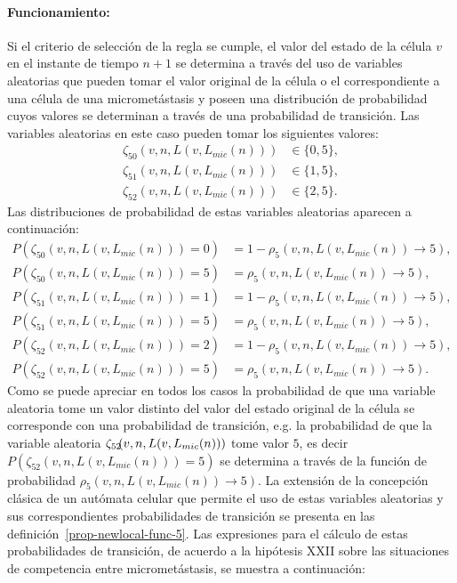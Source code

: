 \paragraph*{{Funcionamiento}:} Si el criterio de selecci\'on de la regla se cumple, el valor del estado de la c\'elula $v$ en el instante de tiempo $n+1$ se determina a trav\'es del uso de variables aleatorias que pueden tomar el valor original de la c\'elula o el correspondiente a una c\'elula de una micromet\'astasis y poseen una distribuci\'on de probabilidad cuyos valores se determinan a trav\'es de una probabilidad de transici\'on. Las variables aleatorias en este caso pueden tomar los siguientes valores:
\begin{align*}
\zeta_{50}(v,n,L(v,L_{mic}(n))) &\in \lbrace 0,5 \rbrace, \\
\zeta_{51}(v,n,L(v,L_{mic}(n))) &\in \lbrace 1,5 \rbrace, \\
\zeta_{52}(v,n,L(v,L_{mic}(n))) &\in \lbrace 2,5 \rbrace.
\end{align*}
Las distribuciones de probabilidad de estas variables aleatorias aparecen a continuaci\'on:
\begin{align*}
P(\zeta_{50}(v,n,L(v,L_{mic}(n)))=0) &= 1 - \rho_5(v,n,L(v,L_{mic}(n)) \rightarrow 5), \\
P(\zeta_{50}(v,n,L(v,L_{mic}(n)))=5) &= \rho_5(v,n,L(v,L_{mic}(n)) \rightarrow 5), \\
P(\zeta_{51}(v,n,L(v,L_{mic}(n)))=1) &= 1 - \rho_5(v,n,L(v,L_{mic}(n)) \rightarrow 5), \\
P(\zeta_{51}(v,n,L(v,L_{mic}(n)))=5) &= \rho_5(v,n,L(v,L_{mic}(n)) \rightarrow 5), \\
P(\zeta_{52}(v,n,L(v,L_{mic}(n)))=2) &= 1 - \rho_5(v,n,L(v,L_{mic}(n)) \rightarrow 5), \\
P(\zeta_{52}(v,n,L(v,L_{mic}(n)))=5) &= \rho_5(v,n,L(v,L_{mic}(n)) \rightarrow 5).
\end{align*}
Como se puede apreciar en todos los casos la probabilidad de que una variable aleatoria tome un valor distinto del valor del estado original de la c\'elula se corresponde con una probabilidad de transici\'on, e.g. la probabilidad de que la variable aleatoria $\zeta_{52}\hspace{-0.09cm}(v,n,L(v,L_{mic}(n)))$ tome valor $5$, es decir $P(\zeta_{52}(v,n,L(v,L_{mic}(n)))=5)$ se determina a trav\'es de la funci\'on de probabilidad $\rho_5(v,n,L(v,L_{mic}(n)) \rightarrow 5)$. La extensi\'on de la concepci\'on cl\'asica de un aut\'omata celular que permite el uso de estas variables aleatorias y sus correspondientes probabilidades de transici\'on se presenta en las definici\'on~\ref{prop-newlocal-func-5}. Las expresiones para el c\'alculo de estas probabilidades de transici\'on, de acuerdo a la hip\'otesis XXII sobre las situaciones de competencia entre micromet\'astasis, se muestra a continuaci\'on:
